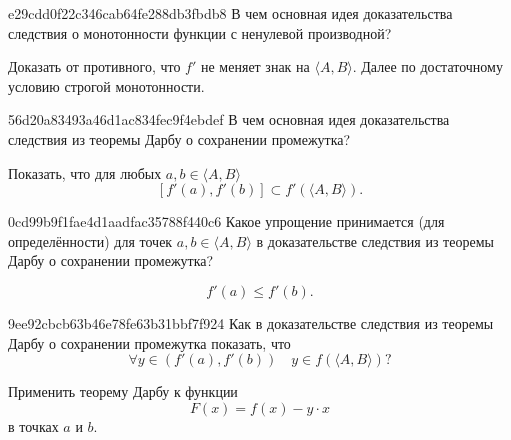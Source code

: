 \begin{note}{e29cdd0f22c346cab64fe288db3fbdb8}
    В чем основная идея доказательства следствия о монотонности функции с ненулевой производной?

    \begin{cloze}{1}
        Доказать от противного, что \( f' \) не меняет знак на \( \langle A, B \rangle  \).
        Далее по достаточному условию строгой монотонности.
    \end{cloze}
\end{note}


\begin{note}{56d20a83493a46d1ac834fec9f4ebdef}
    В чем основная идея доказательства следствия из теоремы Дарбу о сохранении промежутка?

    \begin{cloze}{1}
        Показать, что для любых \( a, b \in \langle A, B \rangle  \)
        \[
            [f'(a), f'(b)] \subset f'(\langle A, B \rangle ).
        \]
    \end{cloze}
\end{note}

\begin{note}{0cd99b9f1fae4d1aadfac35788f440c6}
    Какое упрощение принимается (для определённости) для точек \( a, b \in \langle A, B \rangle  \) в доказательстве следствия из теоремы Дарбу о сохранении промежутка?

    \begin{cloze}{1}
        \[
            f'(a) \leqslant f'(b).
        \]
    \end{cloze}
\end{note}

\begin{note}{9ee92cbcb63b46e78fe63b31bbf7f924}
    Как в доказательстве следствия из теоремы Дарбу о сохранении промежутка показать, что
    \[
        \forall y \in (f'(a), f'(b)) \quad y \in f(\langle A, B \rangle )?
    \]

    \begin{cloze}{1}
        Применить теорему Дарбу к функции
        \[
            F(x) = f(x) - y \cdot x
        \]
        в точках \( a \) и \( b \).
    \end{cloze}
\end{note}

